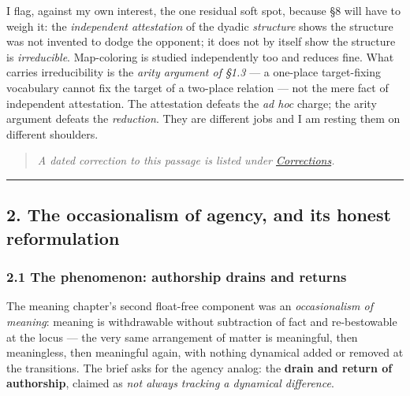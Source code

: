 \documentclass[11pt]{article}
\begin{document}
I flag, against my own interest, the one residual soft spot, because §8 will have to weigh it: the \emph{independent attestation} of the dyadic \emph{structure} shows the structure was not invented to dodge the opponent; it does not by itself show the structure is \emph{irreducible}. Map-coloring is studied independently too and reduces fine. What carries irreducibility is the \emph{arity argument of §1.3} — a one-place target-fixing vocabulary cannot fix the target of a two-place relation — not the mere fact of independent attestation. The attestation defeats the \emph{ad hoc} charge; the arity argument defeats the \emph{reduction}. They are different jobs and I am resting them on different shoulders.

\begin{quote}\small\emph{A dated correction to this passage is listed under \hyperref[corrections]{Corrections}.}\end{quote}

\medskip\noindent\rule{\linewidth}{0.3pt}\medskip

\subsection*{2. The occasionalism of agency, and its honest reformulation}

\subsubsection*{2.1 The phenomenon: authorship drains and returns}

The meaning chapter's second float-free component was an \emph{occasionalism of meaning}: meaning is withdrawable without subtraction of fact and re-bestowable at the locus — the very same arrangement of matter is meaningful, then meaningless, then meaningful again, with nothing dynamical added or removed at the transitions. The brief asks for the agency analog: the \textbf{drain and return of authorship}, claimed as \emph{not always tracking a dynamical difference}.
\end{document}
